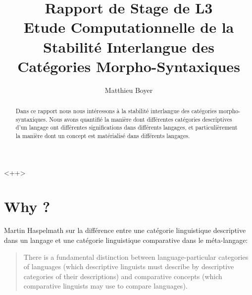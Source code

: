 \documentclass{cours}
\title{Rapport de Stage de L3\\
{\small \sc Etude Computationnelle de la Stabilité Interlangue des Catégories Morpho-Syntaxiques}}
\author{Matthieu Boyer}
\begin{document}
\begin{abstract}
	Dans ce rapport nous nous intéressons à la stabilité interlangue des catégories morpho-syntaxiques.
	Nous avons quantifié la manière dont différentes catégories descriptives d'un langage ont différentes significations dans différents langages,
	et particulièrement la manière dont un concept est matérialisé dans différents langages.
\end{abstract}<++>

\section{Why ?}
Martin Haspelmath sur la différence entre une catégorie linguistique descriptive dans un langage et une catégorie linguistique comparative dans le méta-langage:
\begin{quote}
	There is a fundamental distinction between language-particular categories of languages (which descriptive linguists must describe by descriptive categories of their descriptions) and comparative concepts (which comparative linguists may use to compare languages).
\end{quote}
\end{document}
